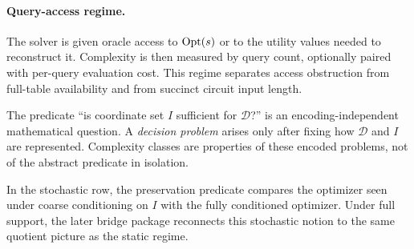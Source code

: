 \paragraph{Query-access regime.}
The solver is given oracle access to $\mathrm{Opt}(s)$ or to the utility values needed to reconstruct it. Complexity is then measured by query count, optionally paired with per-query evaluation cost. This regime separates access obstruction from full-table availability and from succinct circuit input length.

\begin{remark}\label{rem:question-vs-problem}
The predicate ``is coordinate set $I$ sufficient for $\mathcal{D}$?'' is an encoding-independent mathematical question. A \emph{decision problem} arises only after fixing how $\mathcal{D}$ and $I$ are represented. Complexity classes are properties of these encoded problems, not of the abstract predicate in isolation.
\end{remark}

\begin{remark}
In the stochastic row, the preservation predicate compares the optimizer seen under coarse conditioning on $I$ with the fully conditioned optimizer. Under full support, the later bridge package reconnects this stochastic notion to the same quotient picture as the static regime.
\end{remark}
